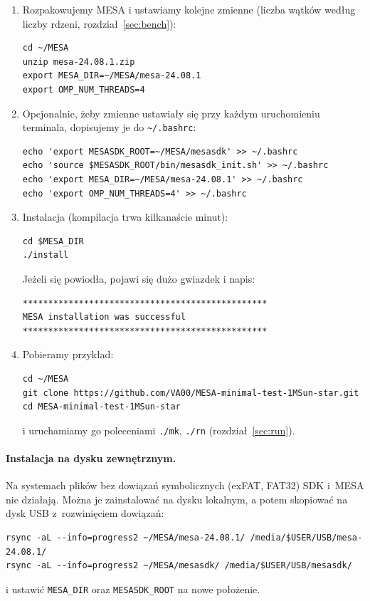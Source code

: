 \documentclass[11pt,a4paper]{article}
\begin{document}
\begin{enumerate}
\begin{verbatim}
sudo apt install tcsh zlib1g-dev libx11-dev git unzip
\end{verbatim}
\item Rozpakowujemy MESA i ustawiamy kolejne zmienne (liczba wątków według liczby rdzeni,
  rozdział~\ref{sec:bench}):
\begin{verbatim}
cd ~/MESA
unzip mesa-24.08.1.zip
export MESA_DIR=~/MESA/mesa-24.08.1
export OMP_NUM_THREADS=4
\end{verbatim}
\item Opcjonalnie, żeby zmienne ustawiały się przy każdym uruchomieniu terminala, dopisujemy je do
  \verb!~/.bashrc!:
\begin{verbatim}
echo 'export MESASDK_ROOT=~/MESA/mesasdk' >> ~/.bashrc
echo 'source $MESASDK_ROOT/bin/mesasdk_init.sh' >> ~/.bashrc
echo 'export MESA_DIR=~/MESA/mesa-24.08.1' >> ~/.bashrc
echo 'export OMP_NUM_THREADS=4' >> ~/.bashrc
\end{verbatim}
\item Instalacja (kompilacja trwa kilkanaście minut):
\begin{verbatim}
cd $MESA_DIR
./install
\end{verbatim}
  Jeżeli się powiodła, pojawi się dużo gwiazdek i napis:
\begin{verbatim}
************************************************
MESA installation was successful
************************************************
\end{verbatim}
\item Pobieramy przykład:
\begin{verbatim}
cd ~/MESA
git clone https://github.com/VA00/MESA-minimal-test-1MSun-star.git
cd MESA-minimal-test-1MSun-star
\end{verbatim}
  i uruchamiamy go poleceniami \verb!./mk!, \verb!./rn! (rozdział~\ref{sec:run}).
\end{enumerate}

\paragraph{Instalacja na dysku zewnętrznym.} Na systemach plików bez dowiązań symbolicznych (exFAT,
FAT32) SDK i~MESA nie działają. Można je zainstalować na dysku lokalnym, a potem skopiować na dysk
USB z~rozwinięciem dowiązań:
\begin{small}
\begin{verbatim}
rsync -aL --info=progress2 ~/MESA/mesa-24.08.1/ /media/$USER/USB/mesa-24.08.1/
rsync -aL --info=progress2 ~/MESA/mesasdk/ /media/$USER/USB/mesasdk/
\end{verbatim}
\end{small}
i ustawić \texttt{MESA\_DIR} oraz \texttt{MESASDK\_ROOT} na nowe położenie.
\end{document}
